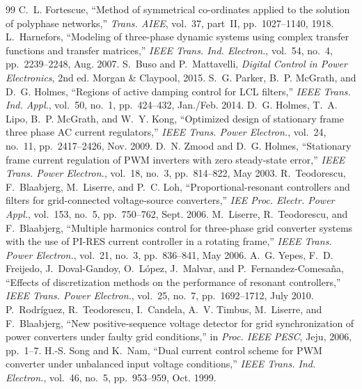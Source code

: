 \documentclass[10pt,a4paper]{scrartcl}
\begin{document}
\begin{onehalfspace}
\begin{thebibliography}{99}
\small
{} C.~L. Fortescue, ``Method of symmetrical co-ordinates applied to the solution of polyphase networks,'' \emph{Trans. AIEE}, vol.~37, part~II, pp.~1027--1140, 1918.
 L.~Harnefors, ``Modeling of three-phase dynamic systems using complex transfer functions and transfer matrices,'' \emph{IEEE Trans. Ind. Electron.}, vol.~54, no.~4, pp.~2239--2248, Aug. 2007.
 S.~Buso and P.~Mattavelli, \emph{Digital Control in Power Electronics}, 2nd ed. Morgan \& Claypool, 2015.
 S.~G. Parker, B.~P. McGrath, and D.~G. Holmes, ``Regions of active damping control for LCL filters,'' \emph{IEEE Trans. Ind. Appl.}, vol.~50, no.~1, pp.~424--432, Jan./Feb. 2014.
 D.~G. Holmes, T.~A. Lipo, B.~P. McGrath, and W.~Y. Kong, ``Optimized design of stationary frame three phase AC current regulators,'' \emph{IEEE Trans. Power Electron.}, vol.~24, no.~11, pp.~2417--2426, Nov. 2009.
 D.~N. Zmood and D.~G. Holmes, ``Stationary frame current regulation of PWM inverters with zero steady-state error,'' \emph{IEEE Trans. Power Electron.}, vol.~18, no.~3, pp.~814--822, May 2003.
 R.~Teodorescu, F.~Blaabjerg, M.~Liserre, and P.~C. Loh, ``Proportional-resonant controllers and filters for grid-connected voltage-source converters,'' \emph{IEE Proc. Electr. Power Appl.}, vol.~153, no.~5, pp.~750--762, Sept. 2006.
 M.~Liserre, R.~Teodorescu, and F.~Blaabjerg, ``Multiple harmonics control for three-phase grid converter systems with the use of PI-RES current controller in a rotating frame,'' \emph{IEEE Trans. Power Electron.}, vol.~21, no.~3, pp.~836--841, May 2006.
 A.~G. Yepes, F.~D. Freijedo, J.~Doval-Gandoy, O.~L\'opez, J.~Malvar, and P.~Fernandez-Comesa\~na, ``Effects of discretization methods on the performance of resonant controllers,'' \emph{IEEE Trans. Power Electron.}, vol.~25, no.~7, pp.~1692--1712, July 2010.
 P.~Rodr\'iguez, R.~Teodorescu, I.~Candela, A.~V. Timbus, M.~Liserre, and F.~Blaabjerg, ``New positive-sequence voltage detector for grid synchronization of power converters under faulty grid conditions,'' in \emph{Proc. IEEE PESC}, Jeju, 2006, pp.~1--7.
 H.-S. Song and K.~Nam, ``Dual current control scheme for PWM converter under unbalanced input voltage conditions,'' \emph{IEEE Trans. Ind. Electron.}, vol.~46, no.~5, pp.~953--959, Oct. 1999.

\end{thebibliography}
\end{onehalfspace}
\end{document}
